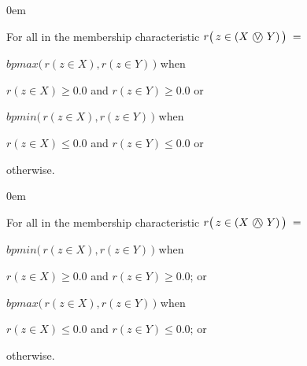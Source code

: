 \documentclass[a4paper,12pt,english]{sphinxhowto}
\begin{document}
\begin{DUlineblock}{0em}
\item[] For all  in  the membership characteristic \(r\big(\,z \in (X  $ \textcircled{$\vee$} $ Y)\,\big)\; =\)
\item[]
\begin{DUlineblock}{\DUlineblockindent}
\item[] \(bpmax \big(\,r(z \in X),r(z \in Y)\, \big)\) when
\item[]
\begin{DUlineblock}{\DUlineblockindent}
\item[] \(r(z \in X) \geqslant 0.0\) and \(r(z \in Y) \geqslant 0.0\) or
\end{DUlineblock}
\item[] \(bpmin \big(\,r(z \in X),r(z \in Y)\, \big)\) when
\item[]
\begin{DUlineblock}{\DUlineblockindent}
\item[] \(r(z \in X) \leqslant 0.0\) and \(r(z \in Y) \leqslant 0.0\) or
\end{DUlineblock}
\item[]  otherwise.
\end{DUlineblock}
\end{DUlineblock}

\begin{DUlineblock}{0em}
\item[] For all  in  the membership characteristic \(r\big(\,z \in (X $ \textcircled{$\wedge$} $ Y)\,\big)\; =\)
\item[]
\begin{DUlineblock}{\DUlineblockindent}
\item[] \(bpmin \big(\,r(z \in X),r(z \in Y)\, \big)\) when
\item[]
\begin{DUlineblock}{\DUlineblockindent}
\item[] \(r(z \in X) \geqslant 0.0\) and \(r(z \in Y) \geqslant 0.0\); or
\end{DUlineblock}
\item[] \(bpmax \big(\,r(z \in X),r(z \in Y)\, \big)\) when
\item[]
\begin{DUlineblock}{\DUlineblockindent}
\item[] \(r(z \in X) \leqslant 0.0\) and \(r(z \in Y) \leqslant 0.0\); or
\end{DUlineblock}
\item[]  otherwise.
\end{DUlineblock}
\end{DUlineblock}
\end{document}
